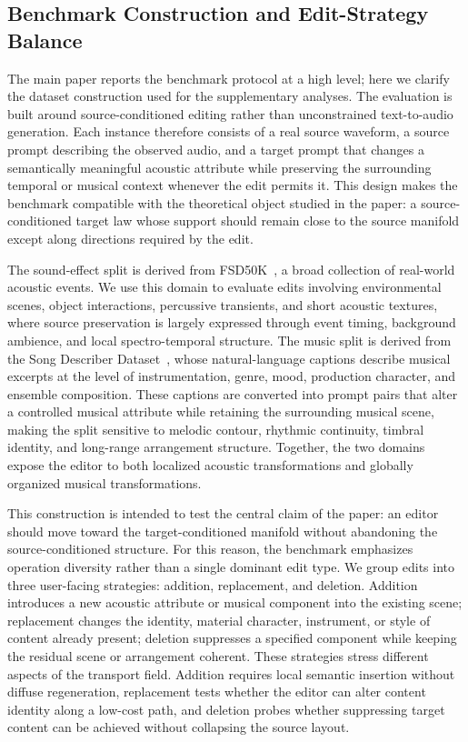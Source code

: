\subsection{Benchmark Construction and Edit-Strategy Balance}
\label{app:benchmark_construction}

The main paper reports the benchmark protocol at a high level; here we clarify the dataset construction used for the supplementary analyses.
The evaluation is built around source-conditioned editing rather than unconstrained text-to-audio generation.
Each instance therefore consists of a real source waveform, a source prompt describing the observed audio, and a target prompt that changes a semantically meaningful acoustic attribute while preserving the surrounding temporal or musical context whenever the edit permits it.
This design makes the benchmark compatible with the theoretical object studied in the paper: a source-conditioned target law whose support should remain close to the source manifold except along directions required by the edit.

The sound-effect split is derived from FSD50K~\cite{Fonseca_2022}, a broad collection of real-world acoustic events.
We use this domain to evaluate edits involving environmental scenes, object interactions, percussive transients, and short acoustic textures, where source preservation is largely expressed through event timing, background ambience, and local spectro-temporal structure.
The music split is derived from the Song Describer Dataset~\cite{manco2023songdescriberdatasetcorpus}, whose natural-language captions describe musical excerpts at the level of instrumentation, genre, mood, production character, and ensemble composition.
These captions are converted into prompt pairs that alter a controlled musical attribute while retaining the surrounding musical scene, making the split sensitive to melodic contour, rhythmic continuity, timbral identity, and long-range arrangement structure.
Together, the two domains expose the editor to both localized acoustic transformations and globally organized musical transformations.

This construction is intended to test the central claim of the paper: an editor should move toward the target-conditioned manifold without abandoning the source-conditioned structure.
For this reason, the benchmark emphasizes operation diversity rather than a single dominant edit type.
We group edits into three user-facing strategies: addition, replacement, and deletion.
Addition introduces a new acoustic attribute or musical component into the existing scene; replacement changes the identity, material character, instrument, or style of content already present; deletion suppresses a specified component while keeping the residual scene or arrangement coherent.
These strategies stress different aspects of the transport field.
Addition requires local semantic insertion without diffuse regeneration, replacement tests whether the editor can alter content identity along a low-cost path, and deletion probes whether suppressing target content can be achieved without collapsing the source layout.

